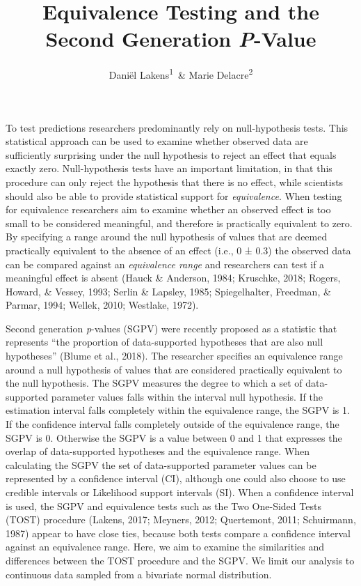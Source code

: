 \documentclass[,man,floatsintext]{apa6}
\title{Equivalence Testing and the Second Generation \emph{P}-Value}
\author{Daniël Lakens\textsuperscript{1}~\& Marie Delacre\textsuperscript{2}}
\date{}
\affiliation{
\vspace{0.5cm}
\textsuperscript{1} Eindhoven University of Technology, Eindhoven, The Netherlands\\\textsuperscript{2} Service of Analysis of the Data, Université Libre de Bruxelles, Belgium}
\begin{document}
\maketitle

To test predictions researchers predominantly rely on null-hypothesis tests.
This statistical approach can be used to examine whether observed data are sufficiently surprising under the null hypothesis to reject an effect that equals exactly zero.
Null-hypothesis tests have an important limitation, in that this procedure can only reject the hypothesis that there is no effect, while scientists should also be able to provide statistical support for \emph{equivalence}.
When testing for equivalence researchers aim to examine whether an observed effect is too small to be considered meaningful, and therefore is practically equivalent to zero.
By specifying a range around the null hypothesis of values that are deemed practically equivalent to the absence of an effect (i.e., 0 ± 0.3) the observed data can be compared against an \emph{equivalence range} and researchers can test if a meaningful effect is absent (Hauck \& Anderson, 1984; Kruschke, 2018; Rogers, Howard, \& Vessey, 1993; Serlin \& Lapsley, 1985; Spiegelhalter, Freedman, \& Parmar, 1994; Wellek, 2010; Westlake, 1972).

Second generation \emph{p}-values (SGPV) were recently proposed as a statistic that represents \enquote{the proportion of data-supported hypotheses that are also null hypotheses} (Blume et al., 2018).
The researcher specifies an equivalence range around a null hypothesis of values that are considered practically equivalent to the null hypothesis.
The SGPV measures the degree to which a set of data-supported parameter values falls within the interval null hypothesis.
If the estimation interval falls completely within the equivalence range, the SGPV is 1.
If the confidence interval falls completely outside of the equivalence range, the SGPV is 0. Otherwise the SGPV is a value between 0 and 1 that expresses the overlap of data-supported hypotheses and the equivalence range.
When calculating the SGPV the set of data-supported parameter values can be represented by a confidence interval (CI), although one could also choose to use credible intervals or Likelihood support intervals (SI).
When a confidence interval is used, the SGPV and equivalence tests such as the Two One-Sided Tests (TOST) procedure (Lakens, 2017; Meyners, 2012; Quertemont, 2011; Schuirmann, 1987) appear to have close ties, because both tests compare a confidence interval against an equivalence range.
Here, we aim to examine the similarities and differences between the TOST procedure and the SGPV.
We limit our analysis to continuous data sampled from a bivariate normal distribution.
\end{document}
